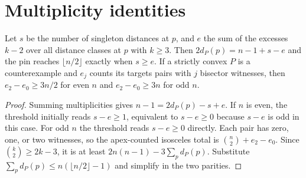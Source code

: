 \section{Multiplicity identities}

\begin{proposition}[982-X07, 982-X08]
Let \(s\) be the number of singleton distances at \(p\), and \(e\) the sum of the excesses \(k-2\) over all distance classes at \(p\) with \(k\ge3\). Then \(2d_P(p)=n-1+s-e\) and the pin reaches \(\lfloor n/2\rfloor\) exactly when \(s\ge e\). If a strictly convex \(P\) is a counterexample and \(e_j\) counts its targets pairs with \(j\) bisector witnesses, then \(e_2-e_0\ge3n/2\) for even \(n\) and \(e_2-e_0\ge3n\) for odd \(n\).
\end{proposition}

\begin{proof}
Summing multiplicities gives \(n-1=2d_P(p)-s+e\). If \(n\) is even, the threshold initially reads \(s-e\ge1\), equivalent to \(s-e\ge0\) because \(s-e\) is odd in this case. For odd \(n\) the threshold reads \(s-e\ge0\) directly.
Each pair has zero, one, or two witnesses, so the apex-counted isosceles total is \(\binom n2+e_2-e_0\). Since \(\binom k2\ge2k-3\), it is at least \(2n(n-1)-3\sum_p d_P(p)\). Substitute \(\sum_p d_P(p)\le n(\lfloor n/2\rfloor-1)\) and simplify in the two parities.
\end{proof}
